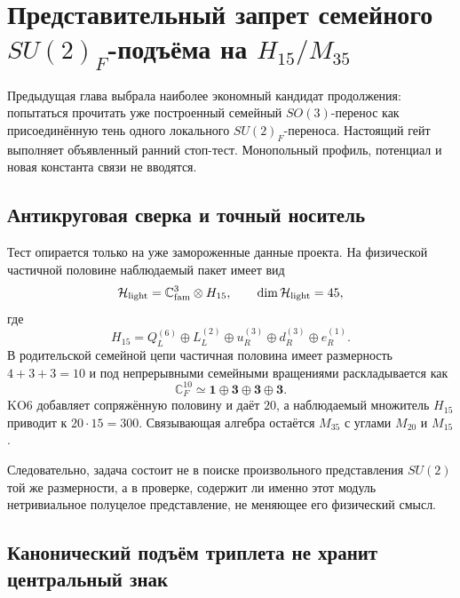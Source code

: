 \chapter{Представительный запрет семейного
\texorpdfstring{$SU(2)_F$}{SU(2)F}-подъёма на
\texorpdfstring{$H_{15}/M_{35}$}{H15/M35}}

Предыдущая глава выбрала наиболее экономный кандидат продолжения:
попытаться прочитать уже построенный семейный $SO(3)$-перенос как
присоединённую тень одного локального $SU(2)_F$-переноса. Настоящий гейт
выполняет объявленный ранний стоп-тест. Монопольный профиль, потенциал и
новая константа связи не вводятся.

\section{Антикруговая сверка и точный носитель}

Тест опирается только на уже замороженные данные проекта. На физической
частичной половине наблюдаемый пакет имеет вид
\begin{equation}
 \mathcal H_{\rm light}=\mathbb C^3_{\rm fam}\otimes H_{15},
 \qquad \dim\mathcal H_{\rm light}=45,
\end{equation}
где
\begin{equation}
 H_{15}=Q_L^{(6)}\oplus L_L^{(2)}\oplus
 u_R^{(3)}\oplus d_R^{(3)}\oplus e_R^{(1)}.
 \label{eq:v5-su2-h15}
\end{equation}
В родительской семейной цепи частичная половина имеет размерность
$4+3+3=10$ и под непрерывными семейными вращениями раскладывается как
\begin{equation}
 \mathbb C^{10}_{F}\simeq\mathbf 1\oplus\mathbf 3\oplus
 \mathbf 3\oplus\mathbf 3.
 \label{eq:v5-su2-family-decomposition}
\end{equation}
KO6 добавляет сопряжённую половину и даёт $20$, а наблюдаемый множитель
$H_{15}$ приводит к $20\cdot15=300$. Связывающая алгебра остаётся
$M_{35}$ с углами $M_{20}$ и $M_{15}$.

Следовательно, задача состоит не в поиске произвольного представления
$SU(2)$ той же размерности, а в проверке, содержит ли именно этот модуль
нетривиальное полуцелое представление, не меняющее его физический смысл.

\section{Канонический подъём триплета не хранит центральный знак}

